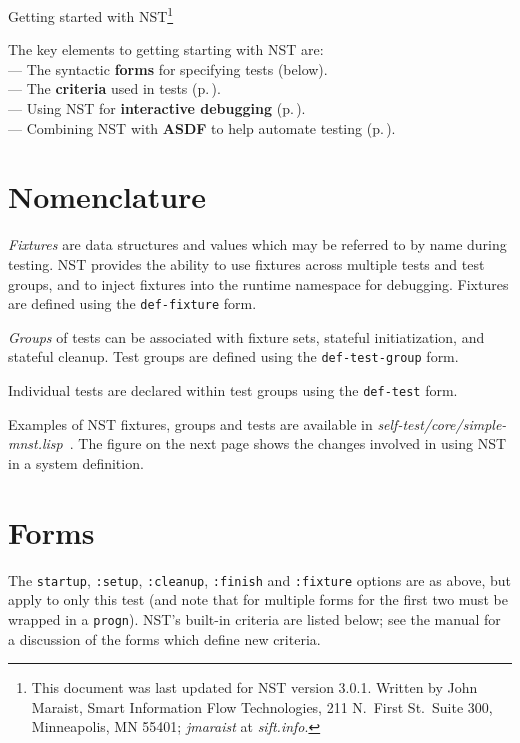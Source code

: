 \documentclass{article}
\begin{document}
\thispagestyle{empty}
\begin{center}
  \LARGE Getting started with NST\footnote{This document was last
    updated for NST version 3.0.1.  Written by John Maraist, Smart
    Information Flow Technologies, 211 N.\ First St.\ Suite 300,
    Minneapolis, MN 55401; \textsl{jmaraist} at \textsl{sift.info}.}
\end{center}

The key elements to getting starting with NST are:
%
\\\hspace*{0.5em}--- The syntactic \textbf{forms} for specifying tests
(below).
%
\\\hspace*{0.5em}--- The \textbf{criteria} used in tests
(p.\,\pageref{sec:criteria}).
%
\\\hspace*{0.5em}--- Using NST for \textbf{interactive debugging}
(p.\,\pageref{sec:interact}).
%
\\\hspace*{0.5em}--- Combining NST with \textbf{ASDF} to help automate
testing (p.\,\pageref{sec:asdf}).

\section*{Nomenclature}
\emph{Fixtures} are data structures and values which may be referred
to by name during testing.  NST provides the ability to use fixtures
across multiple tests and test groups, and to inject fixtures into the
runtime namespace for debugging.  Fixtures are defined using the
\texttt{def-fixture} form.

\emph{Groups} of tests can be associated with fixture sets, stateful
initiatization, and stateful cleanup.  Test groups are defined using
the \texttt{def-test-group} form.

Individual tests are declared within test groups using the
\texttt{def-test} form.

Examples of NST fixtures, groups and tests are available in
\textsl{self-test/core/simple-mnst.lisp}~.  The figure on the next
page shows the changes involved in using NST in a system definition.

\section*{Forms}

%

%
 
The \texttt{startup}, \texttt{:setup}, \texttt{:cleanup},
\texttt{:finish} and \texttt{:fixture} options are as above, but apply
to only this test (and note that for multiple forms for the first two
must be wrapped in a \texttt{progn}).  NST's built-in criteria are
listed below; see the manual for a discussion of the forms which
define new criteria.
\end{document}
